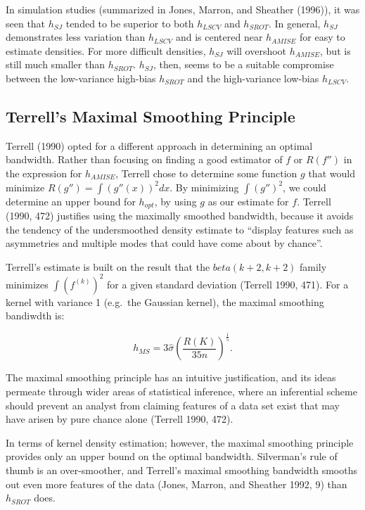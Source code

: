 \documentclass[]{article}
\begin{document}
In simulation studies (summarized in Jones, Marron, and Sheather
(1996)), it was seen that \(h_{SJ}\) tended to be superior to both
\(h_{LSCV}\) and \(h_{SROT}\). In general, \(h_{SJ}\) demonstrates less
variation than \(h_{LSCV}\) and is centered near \(h_{AMISE}\) for easy
to estimate densities. For more difficult densities, \(h_{SJ}\) will
overshoot \(h_{AMISE}\), but is still much smaller than \(h_{SROT}\).
\(h_{SJ}\), then, seems to be a suitable compromise between the
low-variance high-bias \(h_{SROT}\) and the high-variance low-bias
\(h_{LSCV}\).

\subsection{Terrell's Maximal Smoothing
Principle}\label{terrells-maximal-smoothing-principle}

Terrell (1990) opted for a different approach in determining an optimal
bandwidth. Rather than focusing on finding a good estimator of \(f\) or
\(R(f'')\) in the expression for \(h_{AMISE}\), Terrell chose to
determine some function \(g\) that would minimize
\(R(g'') = \int (g '' (x))^2 dx\). By minimizing \(\int (g'')^2\), we
could determine an upper bound for \(h_{opt}\), by using \(g\) as our
estimate for \(f\). Terrell (1990, 472) justifies using the maximally
smoothed bandwidth, because it avoids the tendency of the undersmoothed
density estimate to ``display features such as asymmetries and multiple
modes that could have come about by chance''.

Terrell's estimate is built on the result that the
\(beta(k + 2, k + 2)\) family minimizes \(\int (f^{(k)})^2\) for a given
standard deviation (Terrell 1990, 471). For a kernel with variance 1
(e.g.~the Gaussian kernel), the maximal smoothing bandiwdth is:

\[
h_{MS} =  3 \hat \sigma \left(\frac{R(K)}{35 n} \right)^{\frac{1}{5}}.
\]

The maximal smoothing principle has an intuitive justification, and its
ideas permeate through wider areas of statistical inference, where an
inferential scheme should prevent an analyst from claiming features of a
data set exist that may have arisen by pure chance alone (Terrell 1990,
472).

In terms of kernel density estimation; however, the maximal smoothing
principle provides only an upper bound on the optimal bandwidth.
Silverman's rule of thumb is an over-smoother, and Terrell's maximal
smoothing bandwidth smooths out even more features of the data (Jones,
Marron, and Sheather 1992, 9) than \(h_{SROT}\) does.
\end{document}
